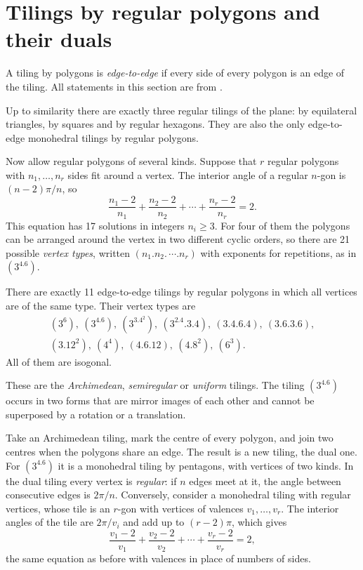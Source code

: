 \section{Tilings by regular polygons and
their duals}
\label{section-regular-polygons}

\noindent
A tiling by polygons is \emph{edge-to-edge} if
every side of every polygon is an edge of the
tiling. All statements in this section are
from \cite[Chapter 2]{GrunbaumShephard1987}.

\begin{theorem}
\label{theorem-regular-tilings}
Up to similarity there are exactly three
regular tilings of the plane: by equilateral
triangles, by squares and by regular
hexagons. They are also the only edge-to-edge
monohedral tilings by regular polygons.
\end{theorem}

\noindent
Now allow regular polygons of several kinds.
Suppose that $r$ regular polygons with
$n_1,\ldots,n_r$ sides fit around a vertex.
The interior angle of a regular $n$-gon is
$(n-2)\pi/n$, so
$$
\frac{n_1-2}{n_1}+\frac{n_2-2}{n_2}+\cdots
+\frac{n_r-2}{n_r}=2.
$$
This equation has 17 solutions in integers
$n_i\geq3$. For four of them the polygons can
be arranged around the vertex in two different
cyclic orders, so there are 21 possible
\emph{vertex types}, written
$(n_1.n_2.\,\cdots.n_r)$ with exponents for
repetitions, as in $(3^4.6)$.

\begin{theorem}
\label{theorem-archimedean}
There are exactly 11 edge-to-edge tilings by
regular polygons in which all vertices are of
the same type. Their vertex types are
$$
\begin{array}{c}
(3^6),\ (3^4.6),\ (3^3.4^2),\ (3^2.4.3.4),\
(3.4.6.4),\ (3.6.3.6),\\
(3.12^2),\ (4^4),\
(4.6.12),\ (4.8^2),\ (6^3).
\end{array}
$$
All of them are isogonal.
\end{theorem}

\noindent
These are the \emph{Archimedean},
\emph{semiregular} or \emph{uniform} tilings.
The tiling $(3^4.6)$ occurs in two forms that
are mirror images of each other and cannot be
superposed by a rotation or a translation.

Take an Archimedean tiling, mark the centre of
every polygon, and join two centres when the
polygons share an edge. The result is a new
tiling, the dual one. For $(3^4.6)$ it is a
monohedral tiling by pentagons, with vertices
of two kinds. In the dual tiling every vertex
is \emph{regular}: if $n$ edges meet at it,
the angle between consecutive edges is
$2\pi/n$. Conversely, consider a monohedral
tiling with regular vertices, whose tile is an
$r$-gon with vertices of valences
$v_1,\ldots,v_r$. The interior angles of the
tile are $2\pi/v_i$ and add up to $(r-2)\pi$,
which gives
$$
\frac{v_1-2}{v_1}+\frac{v_2-2}{v_2}+\cdots
+\frac{v_r-2}{v_r}=2,
$$
the same equation as before with valences in
place of numbers of sides.

